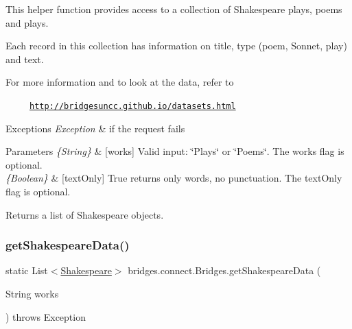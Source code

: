 This helper function provides access to a collection of Shakespeare plays, poems and plays.

Each record in this collection has information on title, type (poem, Sonnet, play) and text. ~\newline


For more information and to look at the data, refer to 

~~~~~\href{http://bridgesuncc.github.io/datasets.html}{\tt http\+://bridgesuncc.\+github.\+io/datasets.\+html} 


\begin{DoxyExceptions}{Exceptions}
{\em Exception} & if the request fails\\
\hline
\end{DoxyExceptions}

\begin{DoxyParams}{Parameters}
{\em \{\+String\}} & \mbox{[}works\mbox{]} Valid input\+: \char`\"{}\+Plays\char`\"{} or \char`\"{}\+Poems\char`\"{}. The works flag is optional.\\
\hline
{\em \{\+Boolean\}} & \mbox{[}text\+Only\mbox{]} True returns only words, no punctuation. The text\+Only flag is optional.\\
\hline
\end{DoxyParams}
\begin{DoxyReturn}{Returns}
a list of Shakespeare objects. 
\end{DoxyReturn}
\mbox{\label{classbridges_1_1connect_1_1_bridges_a53ac587893826c57644f2e03b33ae455}} 
\subsubsection{\texorpdfstring{get\+Shakespeare\+Data()}{getShakespeareData()}\hspace{0.1cm}{\footnotesize\ttfamily [2/3]}}
{\footnotesize\ttfamily static List$<$\mbox{\hyperlink{classbridges_1_1data__src__dependent_1_1_shakespeare}{Shakespeare}}$>$ bridges.\+connect.\+Bridges.\+get\+Shakespeare\+Data (\begin{DoxyParamCaption}\item[{String}]{works }\end{DoxyParamCaption}) throws Exception\hspace{0.3cm}{\ttfamily [static]}}

